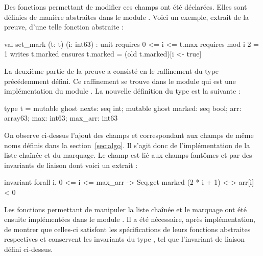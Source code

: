 \documentclass[a4paper]{easychair}
\begin{document}
Des fonctions permettant de modifier ces champs ont été déclarées.
Elles sont définies de manière abstraites dans le module .
Voici un exemple, extrait de la preuve, d'une telle fonction abstraite :
\begin{why3}
val set_mark (t: t) (i: int63) : unit
  requires { 0 <= i <= t.max }
  requires { mod i 2 = 1 }
  writes   { t.marked }
  ensures  { t.marked = (old t.marked)[i <- true] }
\end{why3}

La deuxième partie de la preuve a consisté en le raffinement du type 
précédemment défini. Ce raffinement se trouve dans le module
 qui est une implémentation du module .
La nouvelle définition du type  est la suivante :
\begin{why3}
type t = {
  mutable ghost nexts: seq int;
  mutable ghost marked: seq bool;
  arr: array63;
  max: int63;
  max_arr: int63
}
\end{why3}
On observe ci-dessus l'ajout des champs  et 
correspondant aux champs de même noms définis dans la section~\ref{sec:algo}.
Il s'agit donc de l'implémentation de la liste chaînée et du marquage.
Le champ  est lié aux champs fantômes  et 
par des invariants de liaison dont voici un extrait :
\begin{why3}
invariant { forall i. 0 <= i <= max_arr ->
                 Seq.get marked (2 * i + 1) <-> arr[i] < 0 }
\end{why3}
Les fonctions permettant de manipuler la liste chaînée et le marquage ont été
ensuite implémentées dans le module .
Il a été nécessaire, après implémentation, de montrer que celles-ci
satisfont les spécifications de leurs fonctions abstraites respectives et
conservent les invariants du type , tel que l'invariant de liaison
défini ci-dessus.
\end{document}
